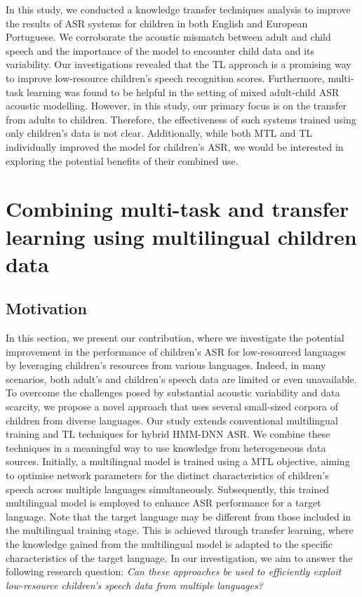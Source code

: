 In this study, we conducted a knowledge transfer techniques analysis to improve the results of \ac{ASR} systems for children in both English and European Portuguese. We corroborate the acoustic mismatch between adult and child speech and the importance of the model to encounter child data and its variability. Our investigations revealed that the \ac{TL} approach is a promising way to improve low-resource children's speech recognition scores. Furthermore, multi-task learning was found to be helpful in the setting of mixed adult-child \ac{ASR} acoustic modelling. 
However, in this study, our primary focus is on the transfer from adults to children. Therefore, the effectiveness of such systems trained using only children's data is not clear. Additionally, while both \ac{MTL} and \ac{TL} individually improved the model for children's \ac{ASR}, we would be interested in exploring the potential benefits of their combined use.


\section{Combining multi-task and transfer learning using multilingual children data}
\subsection{Motivation}
In this section, we present our contribution, where we investigate the potential improvement in the performance of children's \ac{ASR} for low-resourced languages by leveraging children's resources from various languages. Indeed, in many scenarios, both adult's and children's speech data are limited or even unavailable. To overcome the challenges posed by substantial acoustic variability and data scarcity, we propose a novel approach that uses several small-sized corpora of children from diverse languages. Our study extends conventional multilingual training and \ac{TL} techniques for hybrid \ac{HMM-DNN} \ac{ASR}. We combine these techniques in a meaningful way to use knowledge from heterogeneous data sources. Initially, a multilingual model is trained using a \ac{MTL} objective, aiming to optimise network parameters for the distinct characteristics of children's speech across multiple languages simultaneously. Subsequently, this trained multilingual model is employed to enhance \ac{ASR} performance for a target language. Note that the target language may be different from those included in the multilingual training stage. This is achieved through transfer learning, where the knowledge gained from the multilingual model is adapted to the specific characteristics of the target language. In our investigation, we aim to answer the following research question: \textit{Can these approaches be used to efficiently exploit low-resource children's speech data from multiple languages?} 


